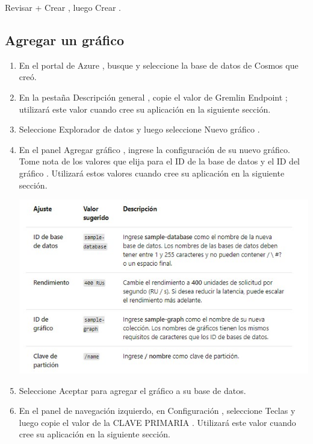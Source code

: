 \documentclass[12pt,letterpaper]{article}
\begin{document}
\begin{enumerate}
		\itemSeleccione Revisar + Crear , luego Crear .

	
	    
	    
\subsection{Agregar un gráfico }
		
	\begin{enumerate}
		
		\item En el portal de Azure , busque y seleccione la base de datos de Cosmos que creó.
	\\	
		\item En la pestaña Descripción general , copie el valor de Gremlin Endpoint ; utilizará este valor cuando cree su aplicación en la siguiente sección.

		\item Seleccione Explorador de datos y luego seleccione Nuevo gráfico .
		
		\item En el panel Agregar gráfico , ingrese la configuración de su nuevo gráfico. Tome nota de los valores que elija para el ID de la base de datos y el ID del gráfico . Utilizará estos valores cuando cree su aplicación en la siguiente sección.
		\begin{center}
			\includegraphics[width=14cm]{./img/2.4.jpg} 
		\end{center}
		\item Seleccione Aceptar para agregar el gráfico a su base de datos.
		
		\item En el panel de navegación izquierdo, en Configuración , seleccione Teclas y luego copie el valor de la CLAVE PRIMARIA . Utilizará este valor cuando cree su aplicación en la siguiente sección.
		

\end{enumerate}
\end{enumerate}
\end{document}
